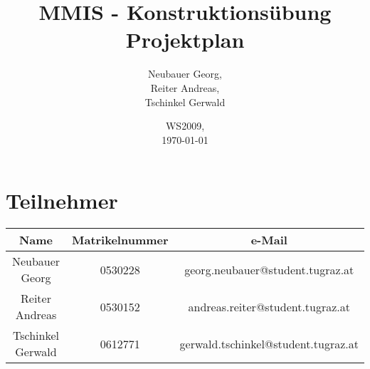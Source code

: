\documentclass[a4paper,10pt]{article}
\begin{document}
\title{\textbf{MMIS - Konstruktionsübung  Projektplan}}
\author{ Neubauer Georg, \\
Reiter Andreas, \\
Tschinkel Gerwald
}
\date{WS2009, \\
\today{}}
\maketitle

\newpage

\section{Teilnehmer}
\begin{tabular}{|ccc|}
\hline
Name & Matrikelnummer & e-Mail \\
\hline
Neubauer Georg & 0530228 & georg.neubauer@student.tugraz.at \\
Reiter Andreas & 0530152 & andreas.reiter@student.tugraz.at \\
Tschinkel Gerwald & 0612771 & gerwald.tschinkel@student.tugraz.at \\
\hline
\end{tabular}
\end{document}
